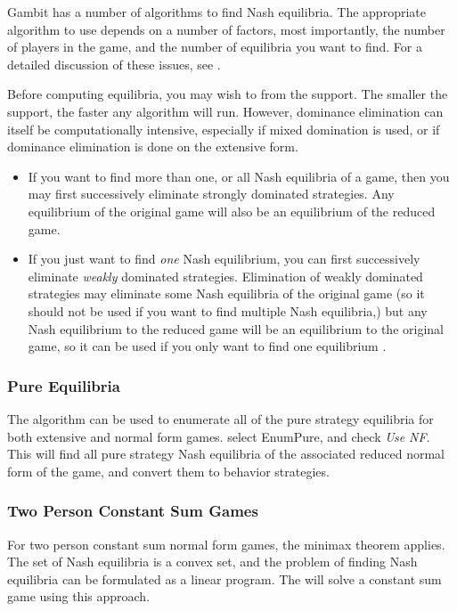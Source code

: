 Gambit has a number of algorithms to find Nash equilibria.  The
appropriate algorithm to use depends on a number of factors, most
importantly, the number of players in the game, and the number of
equilibria you want to find.  For a detailed discussion of these
issues, see \cite{McKMcL:1996}.

Before computing equilibria, you may wish to  from the support.  The smaller the
support, the faster any algorithm will run.  However, dominance
elimination can itself be computationally intensive, especially if
mixed domination is used, or if dominance elimination is done on the
extensive form.

\begin{itemize}
\item 
If you want to find more than one, or all Nash equilibria of a game,
then you may first successively eliminate strongly dominated
strategies.  Any equilibrium of the original game will also be an
equilibrium of the reduced game.
\item 
If you just want to find {\em one} Nash equilibrium, you can first
successively eliminate {\em weakly} dominated strategies.  Elimination
of weakly dominated strategies may eliminate some Nash equilibria of
the original game (so it should not be used if you want to find
multiple Nash equilibria,) but any Nash equilibrium to the reduced
game will be an equilibrium to the original game, so it can be used if
you only want to find one equilibrium .
\end{itemize}

\subsubsection{Pure Equilibria}\label{purenashsec}
The  algorithm can be used to enumerate
all of the pure strategy equilibria for both extensive and normal form
games.  select EnumPure, and check {\em Use NF}.  This will find all pure
strategy Nash equilibria of the associated reduced normal form of the
game, and convert them to behavior strategies.

\subsubsection{Two Person Constant Sum Games}\label{csumsec}
For two person constant sum normal form games, the minimax theorem
applies.  The set of Nash equilibria is a convex set, and the problem
of finding Nash equilibria can be formulated as a linear program.  The 
 will solve a constant sum game using this
approach.


